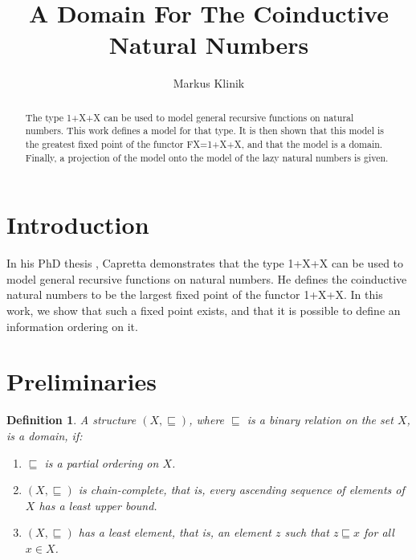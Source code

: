 \documentclass[a4paper]{article}
\newtheorem{defDomain}{Definition}[section]
\begin{document}
\title{A Domain For The Coinductive Natural Numbers}
\author{Markus Klinik}
\maketitle

\begin{abstract}

The type 1+X+X can be used to model general recursive functions on natural
numbers. This work defines a model for that type. It is then shown that this
model is the greatest fixed point of the functor FX=1+X+X, and that the model is
a domain.  Finally, a projection of the model onto the model of the lazy natural
numbers is given.

\end{abstract}

\section{Introduction}

In his PhD thesis \cite{Capretta2002}, Capretta demonstrates that the type 1+X+X
can be used to model general recursive functions on natural numbers.  He defines
the coinductive natural numbers to be the largest fixed point of the functor
1+X+X.  In this work, we show that such a fixed point exists, and that it is
possible to define an information ordering on it.

\section{Preliminaries}




\begin{defDomain}
A structure $(X, \sqsubseteq)$, where $\sqsubseteq$ is a binary relation on the
set $X$, is a \emph{domain}, if:

\begin{enumerate}

  \item
    $\sqsubseteq$ is a partial ordering on $X$.

  \item
    $(X, \sqsubseteq)$ is chain-complete, that is, every ascending sequence of
    elements of $X$ has a least upper bound.

  \item
    $(X, \sqsubseteq)$ has a least element, that is, an element $z$ such that $z
    \sqsubseteq x$ for all $x \in X$.

\end{enumerate}

\end{defDomain}
\end{document}
